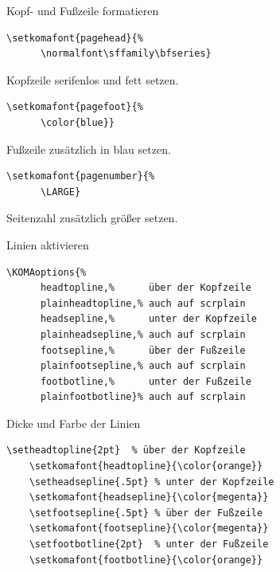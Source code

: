 \begin{Frame}[fragile]{Kopf- und Fußzeile formatieren}
  \begin{lstlisting}[gobble=4]
    \setkomafont{pagehead}{%
      \normalfont\sffamily\bfseries}
  \end{lstlisting}
  Kopfzeile serifenlos und fett setzen.

  \xxx

  \begin{lstlisting}[gobble=4]
    \setkomafont{pagefoot}{%
      \color{blue}}
  \end{lstlisting}
  Fußzeile \alert{zusätzlich} in blau setzen.

  \xxx

  \begin{lstlisting}[gobble=4]
    \setkomafont{pagenumber}{%
      \LARGE}
  \end{lstlisting}
  Seitenzahl \alert{zusätzlich} größer setzen.
\end{Frame}

\begin{Frame}[fragile]{Linien aktivieren}
  \begin{lstlisting}[gobble=4]
    \KOMAoptions{%
      headtopline,%      über der Kopfzeile
      plainheadtopline,% auch auf scrplain
      headsepline,%      unter der Kopfzeile
      plainheadsepline,% auch auf scrplain
      footsepline,%      über der Fußzeile
      plainfootsepline,% auch auf scrplain
      footbotline,%      unter der Fußzeile
      plainfootbotline}% auch auf scrplain
  \end{lstlisting}
\end{Frame}

\begin{Frame}[fragile]{Dicke und Farbe der Linien}
  \begin{lstlisting}[gobble=4]
    \setheadtopline{2pt}  % über der Kopfzeile
    \setkomafont{headtopline}{\color{orange}}
    \setheadsepline{.5pt} % unter der Kopfzeile
    \setkomafont{headsepline}{\color{megenta}}
    \setfootsepline{.5pt} % über der Fußzeile
    \setkomafont{footsepline}{\color{megenta}}
    \setfootbotline{2pt}  % unter der Fußzeile
    \setkomafont{footbotline}{\color{orange}}
  \end{lstlisting}
\end{Frame}

